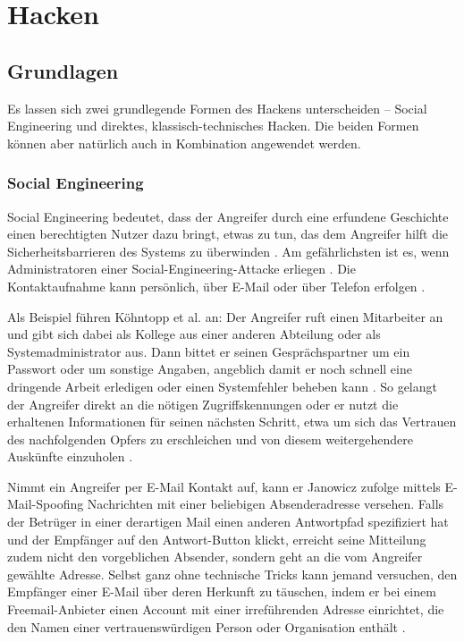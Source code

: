 \section{Hacken}
\subsection{Grundlagen}

Es lassen sich zwei grundlegende Formen des Hackens unterscheiden -- Social
Engineering und direktes, klassisch-technisches Hacken. Die beiden Formen können
aber natürlich auch in Kombination angewendet werden.

\subsubsection{Social Engineering}

Social Engineering bedeutet, dass der Angreifer durch eine erfundene Geschichte
einen berechtigten Nutzer dazu bringt, etwas zu tun, das dem Angreifer hilft die
Sicherheitsbarrieren des Systems zu überwinden \cite[S.~77]{Pip00}. Am
gefährlichsten ist es, wenn Administratoren einer Social-Engineering-Attacke
erliegen \cite[S.~94]{Rae01}. Die Kontaktaufnahme kann persönlich, über E-Mail
oder über Telefon erfolgen \cite[S.~119]{Sta95}.

Als Beispiel führen Köhntopp et al. an: Der Angreifer ruft einen Mitarbeiter an
und gibt sich dabei als Kollege aus einer anderen Abteilung oder als
Systemadministrator aus. Dann bittet er seinen Gesprächspartner um ein Passwort
oder um sonstige Angaben, angeblich damit er noch schnell eine dringende Arbeit
erledigen oder einen Systemfehler beheben kann \cite[S.~15]{KSG98}. So gelangt
der Angreifer direkt an die nötigen Zugriffskennungen oder er nutzt die
erhaltenen Informationen für seinen nächsten Schritt, etwa um sich das Vertrauen
des nachfolgenden Opfers zu erschleichen und von diesem weitergehendere
Auskünfte einzuholen \cite[S.~260]{ScB01}.

Nimmt ein Angreifer per E-Mail Kontakt auf, kann er Janowicz zufolge \zB{}
mittels E-Mail-Spoofing Nachrichten mit einer beliebigen Absenderadresse
versehen. Falls der Betrüger in einer derartigen Mail einen anderen Antwortpfad
spezifiziert hat und der Empfänger auf den Antwort-Button klickt, erreicht seine
Mitteilung zudem nicht den vorgeblichen Absender, sondern geht an die vom
Angreifer gewählte Adresse. Selbst ganz ohne technische Tricks kann jemand
versuchen, den Empfänger einer E-Mail über deren Herkunft zu täuschen, indem er
bei einem Freemail-Anbieter einen Account mit einer irreführenden Adresse
einrichtet, die den Namen einer vertrauenswürdigen Person oder Organisation
enthält \cite[S.~109--110, 123]{Jan02}.

